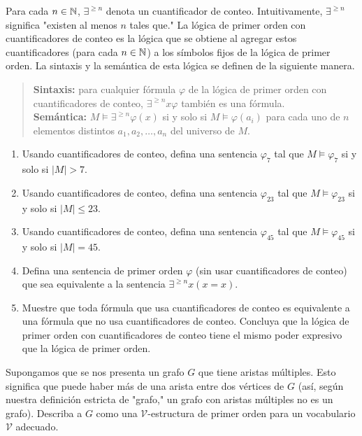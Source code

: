 \message{ !name(main.tex)}\documentclass[12pt,a4paper]{book}
\newcommand{\comillas}[1]{"#1"}
\newcommand{\VV}{\mathcal{V}}
\begin{document}
    \begin{ejercicio}
        Para cada $n\in\mathbb{N}$, $\exists^{\geq n}$ denota un cuantificador de conteo. Intuitivamente, $\exists^{\geq n}$
        significa \comillas{existen al menos $n$ tales que.} La lógica de primer orden con cuantificadores de conteo es
        la lógica que se obtiene al agregar estos cuantificadores (para cada $n\in\mathbb{N}$) a los símbolos fijos de la lógica
        de primer orden. La sintaxis y la semántica de esta lógica se definen de la siguiente manera.

        \begin{quote}
            \textbf{Sintaxis:} para cualquier fórmula $\varphi$ de la lógica de primer orden con cuantificadores de
            conteo, $\exists^{\geq n}x\varphi$ también es una fórmula.\\
            \textbf{Semántica:} $M\models\exists^{\geq n}\varphi(x)$ si y solo si $M\models\varphi(a_{i})$ para cada uno
            de $n$ elementos distintos $a_{1},a_{2},\dots,a_{n}$ del universo de $M$.
        \end{quote}

        \begin{enumerate}[label=(\alph*)]
            \item Usando cuantificadores de conteo, defina una sentencia $\varphi_{7}$ tal que $M\models\varphi_{7}$ si y
            solo si $|M|>7$.
            \item Usando cuantificadores de conteo, defina una sentencia $\varphi_{23}$ tal que $M\models\varphi_{23}$ si
            y solo si $|M|\leq 23$.
            \item Usando cuantificadores de conteo, defina una sentencia $\varphi_{45}$ tal que $M\models\varphi_{45}$ si
            y solo si $|M|=45$.
            \item Defina una sentencia de primer orden $\varphi$ (sin usar cuantificadores de conteo) que sea equivalente
            a la sentencia $\exists^{\geq n}x(x=x)$.
            \item Muestre que toda fórmula que usa cuantificadores de conteo es equivalente a una fórmula que no usa
            cuantificadores de conteo. Concluya que la lógica de primer orden con cuantificadores de conteo tiene el mismo
            poder expresivo que la lógica de primer orden.
        \end{enumerate}
    \end{ejercicio}

    \begin{ejercicio}
        Supongamos que se nos presenta un grafo $G$ que tiene aristas múltiples. Esto significa que puede haber más de
        una arista entre dos vértices de $G$ (así, según nuestra definición estricta de \comillas{grafo,} un grafo con
        aristas múltiples no es un grafo). Describa a $G$ como una $\VV$-estructura de primer orden para un vocabulario
        $\VV$ adecuado.
    \end{ejercicio}
\end{document}
